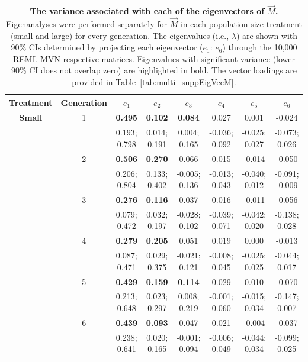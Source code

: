 \newpage
\begin{table}[!htbp]
\renewcommand{\arraystretch}{0.9}
\caption[The variance associated with each of the eigenvectors of $\vec{M}$.]{\textbf{The variance associated with each of the eigenvectors of $\vec{M}$.} Eigenanalyses were performed separately for $\vec{M}$ in each population size treatment (small and large) for every generation. The eigenvalues (i.e., $\lambda$) are shown with 90\% CIs determined by projecting each eigenvector ($e_1$: $e_6$) through the 10,000 REML-MVN respective matrices. Eigenvalues with significant variance (lower 90\% CI does not overlap zero) are highlighted in bold. The vector loadings are provided in Table~\ref{tab:multi_suppEigVecM}.}
\label{tab:multi_Meigvals}
\begin{center}
\scriptsize
\begin{tabular}{>{\bfseries}cccccccc}
\toprule
\textbf{Treatment}& \textbf{Generation} & $e_1$& $e_2$& $e_3$& $e_4$& $e_5$& {$e_6$} \\
\midrule
Small & 1 & \bfseries{0.495} & \bfseries{0.102} & \bfseries{0.084} & 0.027 & 0.001 & -0.024 \\ 
 &  & 0.193; 0.798 & 0.014; 0.191 & 0.004; 0.165 & -0.036; 0.092 & -0.025; 0.027 & -0.073; 0.026 \\ [1.2ex]
 & 2 & \bfseries{0.506} & \bfseries{0.270} & 0.066 & 0.015 & -0.014 & -0.050 \\ 
 &  & 0.206; 0.804 & 0.133; 0.402 & -0.005; 0.136 & -0.013; 0.043 & -0.040; 0.012 & -0.091; -0.009 \\ [1.2ex]
 & 3 & \bfseries{0.276} & \bfseries{0.116} & 0.037 & 0.016 & -0.011 & -0.056 \\ 
 &  & 0.079; 0.472 & 0.032; 0.197 & -0.028; 0.102 & -0.039; 0.071 & -0.042; 0.020 & -0.138; 0.028 \\ [1.2ex]
 & 4 & \bfseries{0.279} & \bfseries{0.205} & 0.051 & 0.019 & 0.000 & -0.013 \\ 
 &  & 0.087; 0.471 & 0.029; 0.375 & -0.021; 0.121 & -0.008; 0.045 & -0.025; 0.025 & -0.044; 0.017 \\ [1.2ex]
 & 5 & \bfseries{0.429} & \bfseries{0.159} & \bfseries{0.114} & 0.029 & 0.010 & -0.070 \\ 
 &  & 0.213; 0.648 & 0.023; 0.297 & 0.008; 0.219 & -0.001; 0.060 & -0.015; 0.034 & -0.147; 0.007 \\ [1.2ex]
 & 6 & \bfseries{0.439} & \bfseries{0.093} & 0.047 & 0.021 & -0.004 & -0.037 \\ 
 &  & 0.238; 0.641 & 0.020; 0.165 & -0.001; 0.094 & -0.006; 0.049 & -0.044; 0.034 & -0.099; 0.025 \\ [1.2ex]

\end{tabular}
\end{center}
\end{table}
